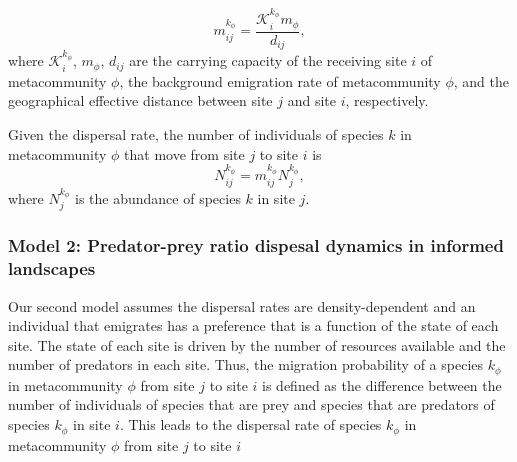 \begin{equation}
  m^{k_{\phi}}_{ij} = \frac{\mathcal{K}^{k_{\phi}}_{i} m_{\phi}}{d_{ij}},
\end{equation}
where $\mathcal{K}^{k_{\phi}}_{i}$, $m_{\phi}$, $d_{ij}$ are the
carrying capacity of the receiving site $i$ of metacommunity $\phi$,
the background emigration rate of metacommunity $\phi$, and the
geographical effective distance between site $j$ and site $i$,
respectively.
 
Given the dispersal rate, the number of individuals of species $k$ in
metacommunity $\phi$ that move from site $j$ to site $i$ is
\begin{equation}
  N^{k_{\phi}}_{ij} =  m^{k_{\phi}}_{ij}  N^{k_{\phi}}_{j},
\end{equation}
where $N^{k_{\phi}}_{j}$ is the abundance of species $k$ in site $j$.


\subsubsection{Model 2: Predator-prey ratio dispesal dynamics in informed landscapes}

Our second model assumes the dispersal rates are density-dependent and
an individual that emigrates has a preference that is a function of
the state of each site. The state of each site is driven by the number
of resources available and the number of predators in each site. Thus,
the migration probability of a species $k_{\mathcal{\phi}}$ in
metacommunity $\mathcal{\phi}$ from site $j$ to site $i$ is defined as
the difference between the number of individuals of species that are
prey and species that are predators of species $k_{\mathcal{\phi}}$ in
site $i$. This leads to the dispersal rate of species
$k_{\mathcal{\phi}}$ in metacommunity $\mathcal{\phi}$ from site $j$
to site $i$

